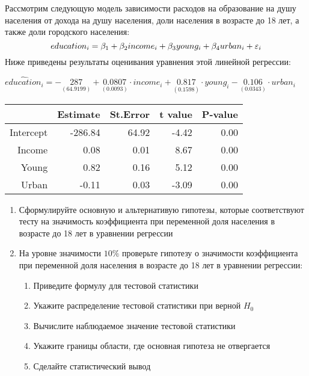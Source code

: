\documentclass[pdftex,11pt,openany]{book}\usepackage[]{graphicx}\usepackage[]{color}
\begin{document}
\begin{problem}
 Рассмотрим следующую модель зависимости расходов на образование на душу населения от дохода на душу населения, доли населения в возрасте до 18 лет, а также доли городского населения: 
\[
education_i = \beta_1 + \beta_2 income_i + \beta_3 young_i + \beta_4 urban_i + \varepsilon_i
\]
Ниже приведены результаты оценивания уравнения этой линейной регрессии:
\begin{center}
\ensuremath{\widehat{education}_i=-\underset{(64.9199)}{287}+\underset{( 0.0093)}{0.0807}\cdot income_i+\underset{( 0.1598)}{0.817}\cdot young_i-\underset{( 0.0343)}{0.106}\cdot urban_i}%
\begin{table}[ht]
\centering
\begin{tabular}{rrrrr}
  \hline
 & Estimate & St.Error & t value & P-value \\ 
  \hline
Intercept & -286.84 & 64.92 & -4.42 & 0.00 \\ 
  Income & 0.08 & 0.01 & 8.67 & 0.00 \\ 
  Young & 0.82 & 0.16 & 5.12 & 0.00 \\ 
  Urban & -0.11 & 0.03 & -3.09 & 0.00 \\ 
   \hline
\end{tabular}
\end{table}


\end{center}

\begin{enumerate}
\item Сформулируйте основную и альтернативую гипотезы, которые соответствуют тесту на значимость коэффициента при переменной доля населения в возрасте до 18 лет в уравнении регрессии
\item На уровне значимости $10\%$ проверьте гипотезу о значимости коэффициента при переменной доля населения в возрасте до 18 лет в уравнении регрессии:
\begin{enumerate}
\item Приведите формулу для тестовой статистики
\item Укажите распределение тестовой статистики при верной $H_0$
\item Вычислите наблюдаемое значение тестовой статистики
\item Укажите границы области, где основная гипотеза не отвергается
\item Сделайте статистический вывод
\end{enumerate}



\end{enumerate}
\end{problem}
\end{document}
